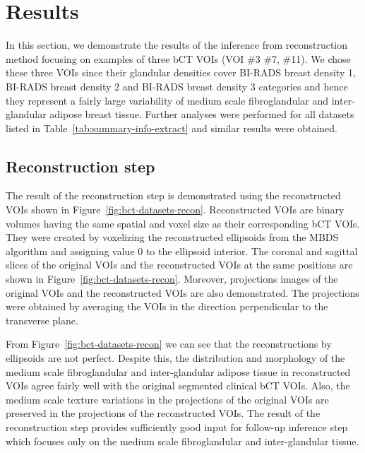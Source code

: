 \documentclass[journal]{IEEEtran}
\begin{document}

\section{Results}
\label{sec:results}

In this section, we demonstrate the results of the inference from
reconstruction method focusing on examples of three bCT VOIs (VOI \#3
\#7, \#11). We chose these three VOIs since their glandular densities
cover BI-RADS breast density 1, BI-RADS breast density 2 and BI-RADS
breast density 3 categories and hence they represent a fairly large
variability of medium scale fibroglandular and inter-glandular adipose
breast tissue. Further analyses were performed for all datasets listed
in Table~\ref{tab:summary-info-extract} and similar results were
obtained.

\subsection{Reconstruction step}
\label{chap4-sec4-sub1:result-reconstr-step}

The result of the reconstruction step is demonstrated using the
reconstructed VOIs shown in
Figure~\ref{fig:bct-datasets-recon}. Reconstructed VOIs are binary
volumes having the same spatial and voxel size as their corresponding
bCT VOIs. They were created by voxelizing the reconstructed ellipsoids
from the MBDS algorithm and assigning value 0 to the ellipsoid
interior. The coronal and sagittal slices of the original VOIs and the
reconstructed VOIs at the same positions are shown in
Figure~\ref{fig:bct-datasets-recon}. Moreover, projections images of
the original VOIs and the reconstructed VOIs are also
demonstrated. The projections were obtained by averaging the VOIs in
the direction perpendicular to the transverse plane.

From Figure~\ref{fig:bct-datasets-recon} we can see that the
reconstructions by ellipsoids are not perfect. Despite this, the
distribution and morphology of the medium scale fibroglandular and
inter-glandular adipose tissue in reconstructed VOIs agree fairly well
with the original segmented clinical bCT VOIs. Also, the medium scale
texture variations in the projections of the original VOIs are
preserved in the projections of the reconstructed VOIs. The result of
the reconstruction step provides sufficiently good input for follow-up
inference step which focuses only on the medium scale fibroglandular
and inter-glandular tissue.
\end{document}
